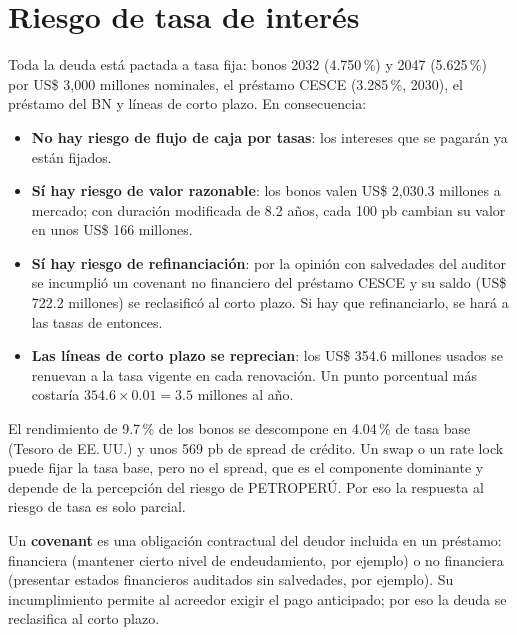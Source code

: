 \section{Riesgo de tasa de interés}


Toda la deuda está pactada a tasa fija: bonos 2032 (4.750\,\%) y 2047 (5.625\,\%) por US\$ 3,000 millones nominales, el préstamo CESCE (3.285\,\%, 2030), el préstamo del BN y líneas de corto plazo. En consecuencia:

\begin{itemize}
\item \textbf{No hay riesgo de flujo de caja por tasas}: los intereses que se pagarán ya están fijados.
\item \textbf{Sí hay riesgo de valor razonable}: los bonos valen US\$ 2,030.3 millones a mercado; con duración modificada de 8.2 años, cada 100 pb cambian su valor en unos US\$ 166 millones.
\item \textbf{Sí hay riesgo de refinanciación}: por la opinión con salvedades del auditor se incumplió un covenant no financiero del préstamo CESCE y su saldo (US\$ 722.2 millones) se reclasificó al corto plazo. Si hay que refinanciarlo, se hará a las tasas de entonces.
\item \textbf{Las líneas de corto plazo se reprecian}: los US\$ 354.6 millones usados se renuevan a la tasa vigente en cada renovación. Un punto porcentual más costaría $354.6\times0.01=3.5$ millones al año.
\end{itemize}

\begin{importante}
El rendimiento de 9.7\,\% de los bonos se descompone en 4.04\,\% de tasa base (Tesoro de EE.\,UU.) y unos 569 pb de spread de crédito. Un swap o un rate lock puede fijar la tasa base, pero no el spread, que es el componente dominante y depende de la percepción del riesgo de PETROPERÚ. Por eso la respuesta al riesgo de tasa es solo parcial.
\end{importante}

\begin{definicion}[Covenant]
Un \textbf{covenant} es una obligación contractual del deudor incluida en un préstamo: financiera (mantener cierto nivel de endeudamiento, por ejemplo) o no financiera (presentar estados financieros auditados sin salvedades, por ejemplo). Su incumplimiento permite al acreedor exigir el pago anticipado; por eso la deuda se reclasifica al corto plazo.
\end{definicion}


